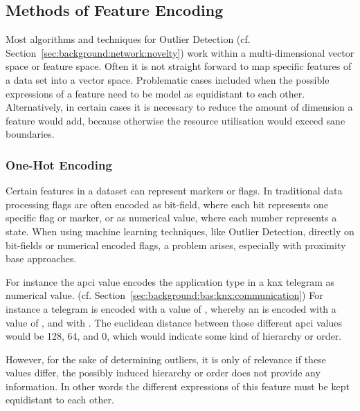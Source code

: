 
\subsection{Methods of Feature Encoding}
\label{sec:background:network:features}

Most algorithms and techniques for Outlier Detection (cf. Section~\ref{sec:background:network:novelty}) work within a multi-dimensional vector space or feature space. Often it is not straight forward to map specific features of a data set into a vector space.
Problematic cases included when the possible expressions of a feature need to be model as equidistant to each other.
Alternatively, in certain cases it is necessary to reduce the amount of dimension a feature would add, because otherwise the resource utilisation would exceed sane boundaries.

\subsubsection{One-Hot Encoding}
\label{sec:background:network:features:onehot}

Certain features in a dataset can represent markers or flags. In traditional data processing flags are often encoded as bit-field, where each bit represents one specific flag or marker, or as numerical value, where each number represents a state.
When using machine learning techniques, like Outlier Detection, directly on bit-fields or numerical encoded flags, a problem arises, especially with proximity base approaches.

For instance the \gls{apci} value encodes the application type in a \gls{knx} telegram as numerical value. (cf. Section~\ref{sec:background:bas:knx:communication})
For instance a  telegram is encoded with a value of , whereby an  is encoded with a value of , and  with .
The euclidean distance between those different \gls{apci} values would be 128, 64, and 0, which would indicate some kind of hierarchy or order.

However, for the sake of determining outliers, it is only of relevance if these values differ, the possibly induced hierarchy or order does not provide any information.
In other words the different expressions of this feature must be kept equidistant to each other.

